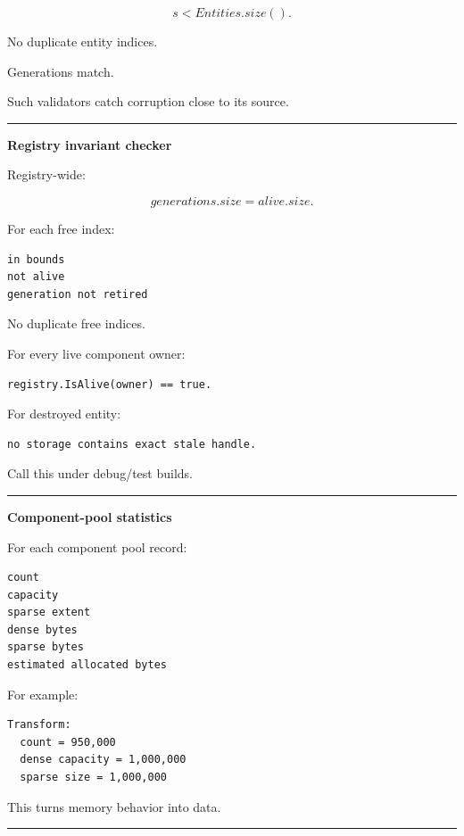 \[
s<Entities.size().
\]

No duplicate entity indices.

Generations match.

Such validators catch corruption close to its source.

\begin{center}\rule{0.5\linewidth}{0.5pt}\end{center}

\textbf{Registry invariant checker}

Registry-wide:

\[
generations.size=alive.size.
\]

For each free index:

\begin{verbatim}
in bounds
not alive
generation not retired
\end{verbatim}

No duplicate free indices.

For every live component owner:

\begin{verbatim}
registry.IsAlive(owner) == true.
\end{verbatim}

For destroyed entity:

\begin{verbatim}
no storage contains exact stale handle.
\end{verbatim}

Call this under debug/test builds.

\begin{center}\rule{0.5\linewidth}{0.5pt}\end{center}

\textbf{Component-pool statistics}

For each component pool record:

\begin{verbatim}
count
capacity
sparse extent
dense bytes
sparse bytes
estimated allocated bytes
\end{verbatim}

For example:

\begin{verbatim}
Transform:
  count = 950,000
  dense capacity = 1,000,000
  sparse size = 1,000,000
\end{verbatim}

This turns memory behavior into data.

\begin{center}\rule{0.5\linewidth}{0.5pt}\end{center}


